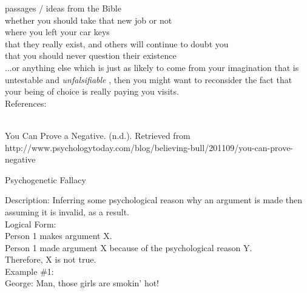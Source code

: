 \documentclass[a4paper,12pt,single,pdftex]{scrartcl}
\begin{document}
    
      passages / ideas from the Bible
    \\

    
      whether you should take that new job or not
    \\

    
      where you left your car keys
    \\

    
      that they really exist, and others will continue to doubt you
    \\

    
      that you should never question their existence
    \\

    
      ...or anything else which is just as likely to come from your imagination that is untestable and {\it unfalsifiable} , then you might want to reconsider the fact that your being of choice is really paying you visits.
    \\

    References:

    
      
        
      \\

      
        
          You Can Prove a Negative. (n.d.). Retrieved from http://www.psychologytoday.com/blog/believing-bull/201109/you-can-prove-negative
        
      
    
  

Psychogenetic Fallacy
    
      Description: Inferring some psychological reason why an argument is made then assuming it is invalid, as a result.
    \\

    
      Logical Form:
    \\

    
      Person 1 makes argument X.
    \\

    
      Person 1 made argument X because of the psychological reason Y.
    \\

    
      Therefore, X is not true.
    \\

    
      Example \#1:
    \\

    
      George: Man, those girls are smokin' hot!
    \\
\end{document}

